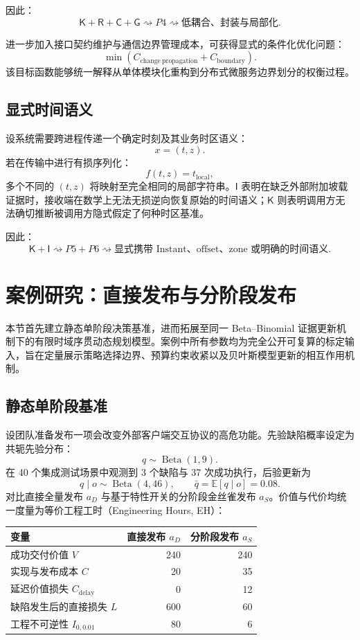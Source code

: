 \documentclass[11pt,a4paper]{ctexart}
\numberwithin{equation}{section}
\theoremstyle{definition}
\theoremstyle{plain}
\newcommand{\Know}{\mathsf{K}}
\newcommand{\Res}{\mathsf{R}}
\newcommand{\Ctrl}{\mathsf{C}}
\newcommand{\Info}{\mathsf{I}}
\newcommand{\Goal}{\mathsf{G}}
\begin{document}
因此：
\[
\Know+\Res+\Ctrl+\Goal
\rightsquigarrow
P4
\rightsquigarrow
\text{低耦合、封装与局部化}.
\]

进一步加入接口契约维护与通信边界管理成本，可获得显式的条件化优化问题：
\[
\min
\left(
C_{\mathrm{change\ propagation}}
+
C_{\mathrm{boundary}}
\right).
\]
该目标函数能够统一解释从单体模块化重构到分布式微服务边界划分的权衡过程。

\subsection{显式时间语义}

设系统需要跨进程传递一个确定时刻及其业务时区语义：
\[
x=(t,z).
\]
若在传输中进行有损序列化：
\[
f(t,z)=t_{\mathrm{local}},
\]
多个不同的 $(t,z)$ 将映射至完全相同的局部字符串。$\Info$ 表明在缺乏外部附加坡载证据时，接收端在数学上无法无损逆向恢复原始的时间语义；$\Know$ 则表明调用方无法确切推断被调用方隐式假定了何种时区基准。

因此：
\[
\Know+\Info
\rightsquigarrow
P5+P6
\rightsquigarrow
\text{显式携带 Instant、offset、zone 或明确的时间语义}.
\]

\section{案例研究：直接发布与分阶段发布}
\label{sec:case}

本节首先建立静态单阶段决策基准，进而拓展至同一 Beta--Binomial 证据更新机制下的有限时域序贯动态规划模型。案例中所有参数均为完全公开可复算的标定输入，旨在定量展示策略选择边界、预算约束收紧以及贝叶斯模型更新的相互作用机制。

\subsection{静态单阶段基准}

设团队准备发布一项会改变外部客户端交互协议的高危功能。先验缺陷概率设定为共轭先验分布：
\[
q\sim\operatorname{Beta}(1,9).
\]
在 40 个集成测试场景中观测到 3 个缺陷与 37 次成功执行，后验更新为
\[
q\mid o\sim\operatorname{Beta}(4,46),
\qquad
\bar q=\mathbb E[q\mid o]=0.08.
\]
对比直接全量发布 $a_D$ 与基于特性开关的分阶段金丝雀发布 $a_S$。价值与代价均统一度量为等价工程工时（Engineering Hours, EH）：

\begin{center}
\begin{tabular}{lrr}
\toprule
变量 & 直接发布 $a_D$ & 分阶段发布 $a_S$\\
\midrule
成功交付价值 $V$ & 240 & 240\\
实现与发布成本 $C$ & 20 & 35\\
延迟价值损失 $C_{\mathrm{delay}}$ & 0 & 12\\
缺陷发生后的直接损失 $L$ & 600 & 60\\
工程不可逆性 $I_{0,0.01}$ & 80 & 6\\
\bottomrule
\end{tabular}
\end{center}
\end{document}
